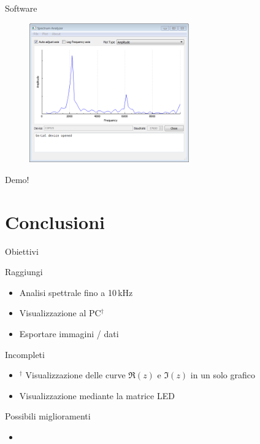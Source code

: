 \documentclass[10pt, xetex, handout]{beamer}
\begin{document}
\begin{frame}{Software}
    \begin{figure} \centering
        \includegraphics[height=6cm]{figures/screenshots/desktop-windows7-square}
    \end{figure}
    \begin{center}
        \LARGE Demo!
    \end{center}
\end{frame}

\section{Conclusioni}
\begin{frame}{Obiettivi}
    \begin{block}{Raggiungi}
    \begin{itemize}
        \item Analisi spettrale fino a 10\,kHz
        \item Visualizzazione al PC\(^\dagger\)
        \item Esportare immagini / dati
    \end{itemize}
    \end{block}
    \pause

    \begin{block}{Incompleti}
    \begin{itemize}
        \item \(^\dagger\) Visualizzazione delle curve \(\Re(z)\) e \(\Im(z)\) in un solo grafico
        \item Visualizzazione mediante la matrice LED
    \end{itemize}
    \end{block}
\end{frame}

\begin{frame}{Possibili miglioramenti}
    \begin{itemize}
        \item 
    \end{itemize}
\end{frame}
\end{document}
